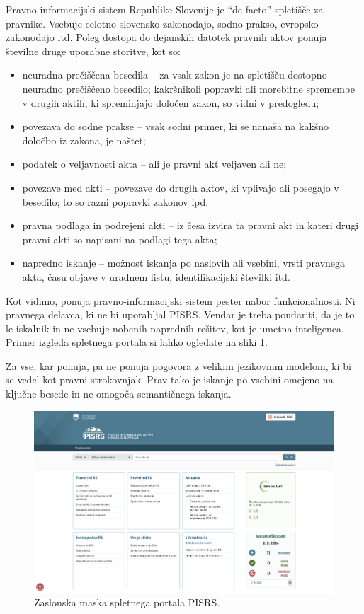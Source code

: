 \documentclass[a4paper,12pt,openright]{book}
\begin{document}
Pravno-informacijski sistem Republike Slovenije \cite{pisrs} je “de facto” spletišče za pravnike. Vsebuje celotno slovensko zakonodajo, sodno prakso, evropsko zakonodajo itd. Poleg dostopa do dejanskih datotek pravnih aktov ponuja številne druge uporabne storitve, kot so:

\begin{itemize}
	\item neuradna prečiščena besedila – za vsak zakon je na spletišču dostopno neuradno prečiščeno besedilo; kakršnikoli popravki ali morebitne spremembe v drugih aktih, ki spreminjajo določen zakon, so vidni v predogledu;
	\item povezava do sodne prakse – vsak sodni primer, ki se nanaša na kakšno določbo iz zakona, je naštet;
	\item podatek o veljavnosti akta – ali je pravni akt veljaven ali ne;
	\item povezave med akti – povezave do drugih aktov, ki vplivajo ali posegajo v besedilo; to so razni popravki zakonov ipd.
	\item pravna podlaga in podrejeni akti – iz česa izvira ta pravni akt in kateri drugi pravni akti so napisani na podlagi tega akta;
	\item napredno iskanje – možnost iskanja po naslovih ali vsebini, vrsti pravnega akta, času objave v uradnem listu, identifikacijski številki itd.
\end{itemize}

Kot vidimo, ponuja pravno-informacijski sistem pester nabor funkcionalnosti. Ni pravnega delavca, ki ne bi uporabljal PISRS. Vendar je treba poudariti, da je to le iskalnik in ne vsebuje nobenih naprednih rešitev, kot je umetna inteligenca. Primer izgleda spletnega portala si lahko ogledate na sliki \ref{pisrs}.

Za vse, kar ponuja, pa ne ponuja pogovora z velikim jezikovnim modelom, ki bi se vedel kot pravni strokovnjak. Prav tako je iskanje po vsebini omejeno na ključne besede in ne omogoča semantičnega iskanja.

\begin{figure}[htbp]
	\centering
	\includegraphics[width=\textwidth]{pisrs.png}
	\caption{Zaslonska maska spletnega portala PISRS.}
	\label{pisrs}
\end{figure}
\end{document}
